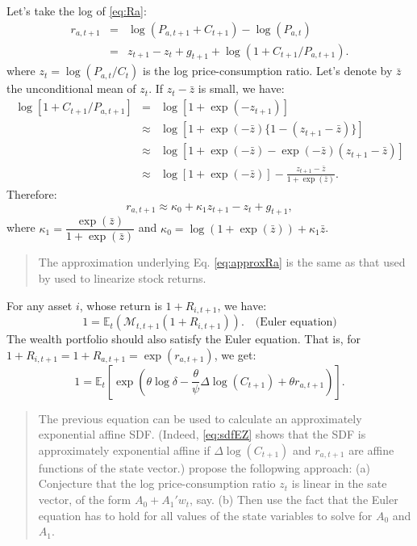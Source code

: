 \documentclass[
  12pt,
]{book}
\theoremstyle{definition}
\theoremstyle{definition}
\theoremstyle{definition}
\theoremstyle{definition}
\theoremstyle{remark}
\begin{document}
Let's take the log of \eqref{eq:Ra}:
\begin{eqnarray*}
r_{a,t+1} &=& \log(P_{a,t+1}+C_{t+1}) - \log(P_{a,t})\\
&=& z_{t+1} - z_t + g_{t+1} + \log(1 + C_{t+1} / P_{a,t+1}).
\end{eqnarray*}
where \(z_t = \log(P_{a,t}/C_t)\) is the log price-consumption ratio.
Let's denote by \(\bar{z}\) the unconditional mean of \(z_t\). If \(z_t - \bar{z}\) is small, we have:
\begin{eqnarray*}
\log[1 + C_{t+1} / P_{a,t+1}] &=& \log[1 + \exp(-z_{t+1})]\\
&\approx& \log[1 + \exp(-\bar{z})\{1 - (z_{t+1}- \bar{z})\}]\\
&\approx& \log[1 + \exp(-\bar{z}) - \exp(-\bar{z})(z_{t+1}- \bar{z})]\\
&\approx& \log[1 + \exp(-\bar{z})] - \frac{z_{t+1}- \bar{z}}{1 + \exp(\bar{z})}.
\end{eqnarray*}
Therefore:
\begin{equation}
\boxed{r_{a,t+1} \approx \kappa_0 + \kappa_1 z_{t+1} - z_t + g_{t+1},}\label{eq:approxRa}
\end{equation}
where \(\kappa_1= \dfrac{\exp(\bar{z})}{1 + \exp(\bar{z})}\) and \(\kappa_0 = \log(1 + \exp(\bar{z})) + \kappa_1 \bar{z}\).

\begin{quote}
The approximation underlying Eq. \eqref{eq:approxRa} is the same as that used by \citet{Campbell_Shiller_1988} used to linearize stock returns.
\end{quote}

For any asset \(i\), whose return is \(1+R_{i,t+1}\), we have:
\begin{equation}
1 = \mathbb{E}_t(\mathcal{M}_{t,t+1}(1+R_{i,t+1})). \quad \mbox{(Euler equation)}\label{eq:Euler}
\end{equation}
The wealth portfolio should also satisfy the Euler equation. That is, for \(1+R_{i,t+1} = 1+R_{a,t+1} = \exp(r_{a,t+1})\), we get:
\begin{equation}
1 = \mathbb{E}_t \left[ \exp\left(\theta \log \delta - \frac{\theta}{\psi} \Delta \log(C_{t+1}) + \theta r_{a,t+1} \right) \right].\label{eq:sdfRa}
\end{equation}

\begin{quote}
The previous equation can be used to calculate an approximately exponential affine SDF. (Indeed, \eqref{eq:sdfEZ} shows that the SDF is approximately exponential affine if \(\Delta \log(C_{t+1})\) and \(r_{a,t+1}\) are affine functions of the state vector.) \citet{Bansal_Yaron_2004} propose the follopwing approach: (a) Conjecture that the log price-consumption ratio \(z_t\) is linear in the sate vector, of the form \(A_0 + A_1'w_t\), say. (b) Then use the fact that the Euler equation has to hold for all values of the state variables to solve for \(A_0\) and \(A_1\).
\end{quote}
\end{document}
